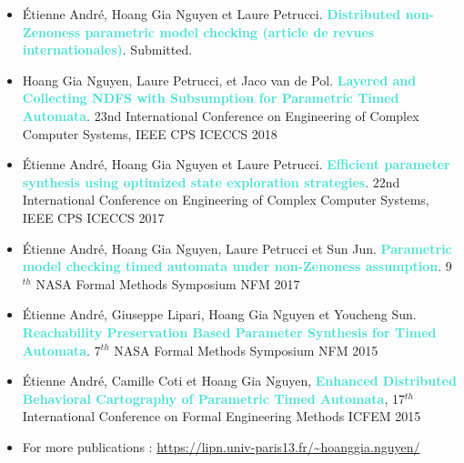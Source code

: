 \documentclass[10pt,a4paper,ragged2e]{altacv}
\begin{document}
	
	
	
	\nocite{*}
	
%	
%	
%	
%	
	
	\begin{itemize}
		\item Étienne André, Hoang Gia Nguyen et  Laure Petrucci. \textcolor{Turquoise}{\textbf{Distributed non-Zenoness parametric model checking (article de revues internationales)}}. Submitted.
		\item Hoang Gia Nguyen, Laure Petrucci, et Jaco van de Pol. \textcolor{Turquoise}{\textbf{Layered and Collecting NDFS with Subsumption for Parametric Timed Automata}}. 23nd International Conference on Engineering of Complex Computer Systems, IEEE CPS {ICECCS 2018}
		\item Étienne André, Hoang Gia Nguyen et Laure Petrucci. \textcolor{Turquoise}{\textbf{Efficient parameter synthesis using optimized state exploration strategies}}. 22nd International Conference on Engineering of Complex Computer Systems, IEEE CPS {ICECCS 2017}
		\item Étienne André, Hoang Gia Nguyen,  Laure Petrucci et Sun Jun. \textcolor{Turquoise}{\textbf{Parametric model checking timed automata under non-Zenoness assumption}}. 
		9$^{th}$ NASA Formal Methods Symposium {NFM 2017}
		\item Étienne André, Giuseppe Lipari, Hoang Gia Nguyen et Youcheng Sun. \textcolor{Turquoise}{\textbf{Reachability Preservation Based Parameter Synthesis for Timed Automata}}. 
		7$^{th}$ NASA Formal Methods Symposium {NFM 2015}
		\item Étienne André, Camille Coti et Hoang Gia Nguyen, \textcolor{Turquoise}{\textbf{Enhanced Distributed Behavioral Cartography of Parametric Timed Automata}}, 17$^{th}$ International Conference on Formal Engineering Methods ICFEM 2015
		
		\item For more publications : \href{https://lipn.univ-paris13.fr/\textasciitilde{}hoanggia.nguyen/}{https://lipn.univ-paris13.fr/\textasciitilde{}hoanggia.nguyen/}
	\end{itemize}
	
\end{document}

